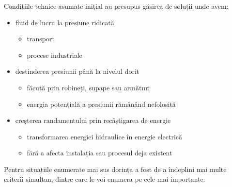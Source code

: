 Condițiile tehnice asumate inițial au presupus găsirea de soluții unde avem:

\begin{itemize}
	\item fluid de lucru la presiune ridicată
		\begin{itemize}
			\item transport
			\item procese industriale
		\end{itemize}
	\item destinderea presiunii până la nivelul dorit
		\begin{itemize}
			\item făcută prin robineți, supape sau armături
			\item energia potențială a presiunii rămânând nefolosită
		\end{itemize}
	\item creșterea randamentului prin recâștigarea de energie
		\begin{itemize}
			\item transformarea energiei hidraulice în energie electrică
			\item fără a afecta instalația sau procesul deja existent
		\end{itemize}	
\end{itemize}

Pentru situațiile enumerate mai sus dorința a fost de a îndeplini mai multe criterii simultan, dintre care le voi enumera pe cele mai importante:

